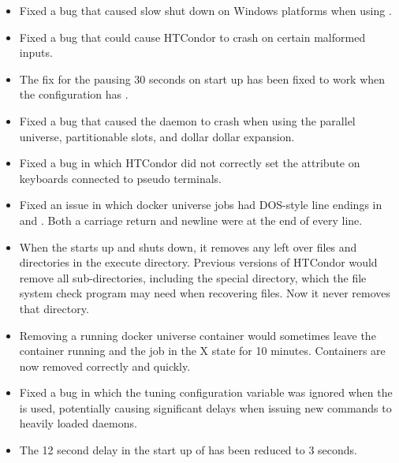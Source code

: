 \begin{itemize}

\item Fixed a bug that caused slow shut down on Windows platforms
when using .

\item Fixed a bug that could cause HTCondor to crash on certain malformed
inputs.

\item The fix for the  pausing 30 seconds on start up
has been fixed to work when the configuration has
.

\item Fixed a bug that caused the  daemon to crash 
when using the parallel universe, 
partitionable slots, and dollar dollar expansion.

\item Fixed a bug in which HTCondor did not correctly set the 
 attribute on keyboards connected to pseudo terminals.

\item Fixed an issue in which docker universe jobs had DOS-style line
endings in  and .
Both a carriage return and newline were at the end of every line.

\item When the  starts up and shuts down, 
it removes any left over files and directories in the execute directory.  
Previous versions of HTCondor would remove all sub-directories, 
including the special  directory, 
which the file system check program may need when recovering files.  
Now it never removes that directory.

\item Removing a running docker universe container would sometimes
leave the container running and the job in the X state for 10 minutes.
Containers are now removed correctly and quickly.

\item Fixed a bug in which the tuning configuration variable 
 was ignored when 
the  is used,
potentially causing significant delays when issuing new commands to 
heavily loaded  daemons.

\item The 12 second delay in the start up of  
has been reduced to 3 seconds.


\end{itemize}
